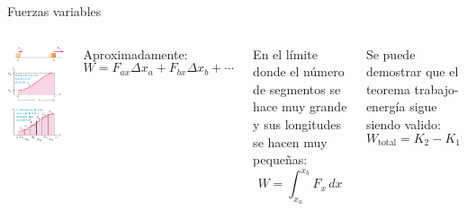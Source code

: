 \documentclass[9pt, aspectratio=169]{beamer}
\begin{document}
\begin{frame}{Fuerzas variables}
\begin{columns}
\begin{center}
    \includegraphics[height=0.8\textheight]{figs/fig-06.png}
\end{center}
Aproximadamente:
\[ W = F_{ax} \Delta x_a + F_{bx} \Delta x_b + \cdots \]

En el límite donde el número de segmentos se hace muy grande y sus longitudes se hacen muy pequeñas:
\[ W = \int_{x_a}^{x_b} F_x \, dx \]

Se puede demostrar que el teorema trabajo-energía sigue siendo valido:
\[ W_{\text{total}} = K_2 - K_1 \]
\end{columns}
\end{frame}
\end{document}
